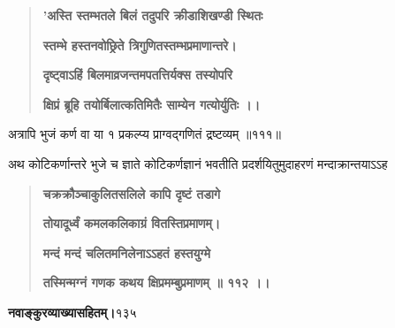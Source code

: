 \documentclass[11pt, openany]{book}
\begin{document}
\begin{sloppypar}
\begin{quote}
\hspace{0.5in}\textbf{'अस्ति स्तम्भतले बिलं तदुपरि क्रीडाशिखण्डी स्थितः}

\hspace{0.5in}\textbf{स्तम्भे हस्तनवोछ्रिते त्रिगुणितस्तम्भप्रमाणान्तरे।}

\hspace{0.5in}\textbf{दृष्ट्वाऽहिं बिलमाव्रजन्तमपतत्तिर्यक्स तस्योपरि}

\hspace{0.5in}\textbf{क्षिप्रं ब्रूहि तयोर्बिलात्कतिमितैः साम्येन गत्योर्युतिः ।।}
\end{quote}

\hangindent=0.2in \hspace{0.2in}अत्रापि भुजं कर्ण वा या १ प्रकल्प्य प्राग्वद्गणितं द्रष्टव्यम् ॥१११॥

\hangindent=0.2in \hspace{0.2in}अथ कोटिकर्णान्तरे भुजे च ज्ञाते कोटिकर्णज्ञानं भवतीति प्रदर्शयितुमुदाहरणं मन्दाक्रान्तयाऽऽह\textendash

\begin{quote}
\hspace{1in}\textbf{चक्रक्रौञ्चाकुलितसलिले कापि दृष्टं तडागे}

\hspace{1in}\textbf{तोयादूर्ध्वं कमलकलिकाग्रं वितस्तिप्रमाणम्।}

\hspace{1in}\textbf{मन्दं मन्दं चलितमनिलेनाऽऽहतं हस्तयुग्मे}

\hspace{1in}\textbf{तस्मिन्मग्नं गणक कथय क्षिप्रमम्बुप्रमाणम् ॥ ११२ ।।}
\end{quote}
\end{sloppypar}
\thispagestyle{empty}
\newpage

\onehalfspacing
\hspace{2in}\textbf{नवाङ्कुरव्याख्यासहितम्।}\hspace{2in}१३५

\vspace{5mm}
\end{document}
